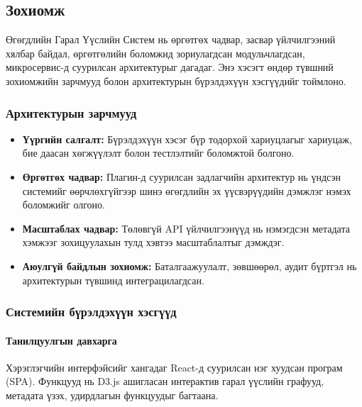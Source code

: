 \subsection{Зохиомж}
\label{subsec:dl_design}

Өгөгдлийн Гарал Үүслийн Систем нь өргөтгөх чадвар, засвар үйлчилгээний хялбар байдал, өргөтгөлийн боломжид зориулагдсан модульчлагдсан, микросервис-д суурилсан архитектурыг дагадаг. Энэ хэсэгт өндөр түвшний зохиомжийн зарчмууд болон архитектурын бүрэлдэхүүн хэсгүүдийг тоймлоно.

\subsubsection{Архитектурын зарчмууд}

\begin{itemize}
    \item \textbf{Үүргийн салгалт:} Бүрэлдэхүүн хэсэг бүр тодорхой хариуцлагыг хариуцаж, бие даасан хөгжүүлэлт болон тестлэлтийг боломжтой болгоно.
    
    \item \textbf{Өргөтгөх чадвар:} Плагин-д суурилсан задлагчийн архитектур нь үндсэн системийг өөрчлөхгүйгээр шинэ өгөгдлийн эх үүсвэрүүдийн дэмжлэг нэмэх боломжийг олгоно.
    
    \item \textbf{Масштаблах чадвар:} Төлөвгүй API үйлчилгээнүүд нь нэмэгдсэн метадата хэмжээг зохицуулахын тулд хэвтээ масштаблалтыг дэмждэг.
    
    \item \textbf{Аюулгүй байдлын зохиомж:} Баталгаажуулалт, зөвшөөрөл, аудит бүртгэл нь архитектурын түвшинд интеграцилагдсан.
\end{itemize}

\subsubsection{Системийн бүрэлдэхүүн хэсгүүд}

\paragraph{Танилцуулгын давхарга}
Хэрэглэгчийн интерфэйсийг хангадаг React-д суурилсан нэг хуудсан програм (SPA). Функцууд нь D3.js ашигласан интерактив гарал үүслийн графууд, метадата үзэх, удирдлагын функцуудыг багтаана.

